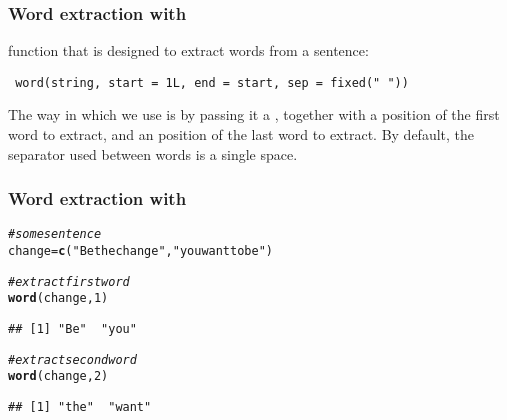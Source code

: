 \documentclass[12pt]{beamer}\usepackage[]{graphicx}\usepackage[]{color}
\makeatletter
\newcommand{\hlnum}[1]{\textcolor[rgb]{0.686,0.059,0.569}{#1}}%
\newcommand{\hlstr}[1]{\textcolor[rgb]{0.192,0.494,0.8}{#1}}%
\newcommand{\hlcom}[1]{\textcolor[rgb]{0.678,0.584,0.686}{\textit{#1}}}%
\newcommand{\hlstd}[1]{\textcolor[rgb]{0.345,0.345,0.345}{#1}}%
\newcommand{\hlkwb}[1]{\textcolor[rgb]{0.69,0.353,0.396}{#1}}%
\newcommand{\hlkwd}[1]{\textcolor[rgb]{0.737,0.353,0.396}{\textbf{#1}}}%
\newenvironment{kframe}{%
 \def\at@end@of@kframe{}%
 \ifinner\ifhmode%
  \def\at@end@of@kframe{\end{minipage}}%
  \begin{minipage}{\columnwidth}%
 \fi\fi%
 \def\FrameCommand##1{\hskip\@totalleftmargin \hskip-\fboxsep
 \colorbox{shadecolor}{##1}\hskip-\fboxsep
     \hskip-\linewidth \hskip-\@totalleftmargin \hskip\columnwidth}%
 \MakeFramed {\advance\hsize-\width
   \@totalleftmargin\z@ \linewidth\hsize
   \@setminipage}}%
 {\par\unskip\endMakeFramed%
 \at@end@of@kframe}
\newenvironment{knitrout}{}{} %
\makeatother
\begin{document}

\begin{frame}[fragile]
\frametitle{Word extraction with }

 function that is designed to extract words from a sentence:
\begin{verbatim}
 word(string, start = 1L, end = start, sep = fixed(" "))
\end{verbatim}

The way in which we use  is by passing it a , together with a  position of the first word to extract, and an  position of the last word to extract. By default, the separator  used between words is a single space.

\end{frame}


\begin{frame}[fragile]
\frametitle{Word extraction with }

\begin{knitrout}\footnotesize
{}\color{fgcolor}\begin{kframe}
\begin{alltt}
\hlcom{# some sentence}
\hlstd{change} \hlkwb{=} \hlkwd{c}\hlstd{(}\hlstr{"Be the change"}\hlstd{,} \hlstr{"you want to be"}\hlstd{)}

\hlcom{# extract first word}
\hlkwd{word}\hlstd{(change,} \hlnum{1}\hlstd{)}
\end{alltt}
\begin{verbatim}
## [1] "Be"  "you"
\end{verbatim}
\begin{alltt}
\hlcom{# extract second word}
\hlkwd{word}\hlstd{(change,} \hlnum{2}\hlstd{)}
\end{alltt}
\begin{verbatim}
## [1] "the"  "want"
\end{verbatim}
\end{kframe}
\end{knitrout}

\end{frame}

\end{document}
